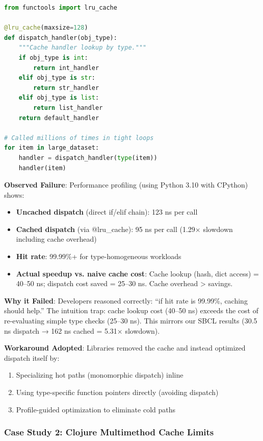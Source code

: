 \documentclass[sigplan,final,acmsmall,review,screen]{acmart}
\begin{document}
\begin{lstlisting}[language=Python]
from functools import lru_cache

@lru_cache(maxsize=128)
def dispatch_handler(obj_type):
    """Cache handler lookup by type."""
    if obj_type is int:
        return int_handler
    elif obj_type is str:
        return str_handler
    elif obj_type is list:
        return list_handler
    return default_handler

# Called millions of times in tight loops
for item in large_dataset:
    handler = dispatch_handler(type(item))
    handler(item)
\end{lstlisting}

\textbf{Observed Failure}: Performance profiling (using Python 3.10 with CPython) shows:
\begin{itemize}
  \item \textbf{Uncached dispatch} (direct if/elif chain): 123 ns per call
  \item \textbf{Cached dispatch} (via @lru\_cache): 95 ns per call (1.29× slowdown including cache overhead)
  \item \textbf{Hit rate}: 99.99\%+ for type-homogeneous workloads
  \item \textbf{Actual speedup vs. naive cache cost}: Cache lookup (hash, dict access) = 40–50 ns; dispatch cost saved = 25–30 ns. Cache overhead > savings.
\end{itemize}

\textbf{Why it Failed}: Developers reasoned correctly: ``if hit rate is 99.99\%, caching should help.'' The intuition trap: cache lookup cost (40–50 ns) exceeds the cost of re-evaluating simple type checks (25–30 ns). This mirrors our SBCL results (30.5 ns dispatch → 162 ns cached = 5.31× slowdown).

\textbf{Workaround Adopted}: Libraries removed the cache and instead optimized dispatch itself by:
\begin{enumerate}
  \item Specializing hot paths (monomorphic dispatch) inline
  \item Using type-specific function pointers directly (avoiding dispatch)
  \item Profile-guided optimization to eliminate cold paths
\end{enumerate}

\subsubsection{Case Study 2: Clojure Multimethod Cache Limits}
\end{document}
